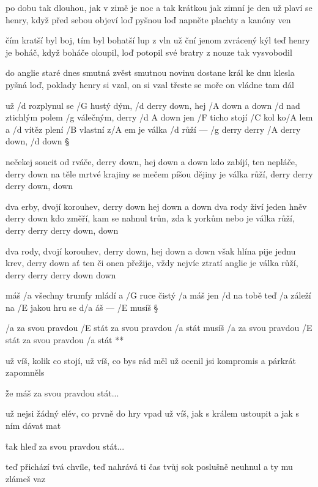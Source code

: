 po dobu tak dlouhou, jak v zimě je noc
a tak krátkou jak zimní je den
už plaví se henry, když před sebou objeví loď pyšnou loď
napněte plachty a kanóny ven \s

čím kratší byl boj, tím byl bohatší lup
z vln už ční jenom zvrácený kýl
teď henry je boháč, když boháče oloupil, loď potopil
své bratry z nouze tak vysvobodil \s

do anglie staré dnes smutná zvěst
smutnou novinu dostane král
ke dnu klesla pyšná loď, poklady henry si vzal, on si vzal
třeste se moře on vládne tam dál




už /d rozplynul se /G hustý dým, /d derry down, hej /A down a down
/d nad ztichlým polem /g válečným, derry /{d A} down
jen /F ticho stojí /C kol ko/A lem a /d vítěz plení /B vlastní z/A em
je válka /d růží --- /g derry derry /A derry down, /d down \S

nečekej soucit od rváče, derry down, hej down a down
kdo zabíjí, ten nepláče, derry down
na těle mrtvé krajiny se mečem píšou dějiny
je válka růží, derry derry derry down, down \s

dva erby, dvojí korouhev, derry down hej down a down
dva rody živí jeden hněv derry down
kdo změří, kam se nahnul trůn, zda k yorkům nebo 
je válka růží, derry derry derry down, down \s

dva rody, dvojí korouhev, derry down, hej down a down
však hlína pije jednu krev, derry down
ať ten či onen přežije, vždy nejvíc ztratí anglie
je válka růží, derry derry derry down down




máš /a všechny trumfy mládí a /G ruce čistý /a máš
jen /d na tobě teď /a záleží na /E jakou hru se d/a áš --- /E musíš \S

\R /a za svou pravdou /E stát
   za svou pravdou /a stát
   musíš /a za svou pravdou /E stát
   za svou pravdou /a stát **

už víš, kolik co stojí, už víš, co bys rád měl
už ocenil jsi kompromis a párkrát zapomněls \s

\r že máš za svou pravdou stát...

už nejsi žádný elév, co prvně do hry vpad
už víš, jak s králem ustoupit a jak s ním dávat mat \s

\r tak hleď za svou pravdou stát...

teď přichází tvá chvíle, teď nahrává ti čas
tvůj  sok poslušně neuhnul a ty  mu zlámeš vaz \s

